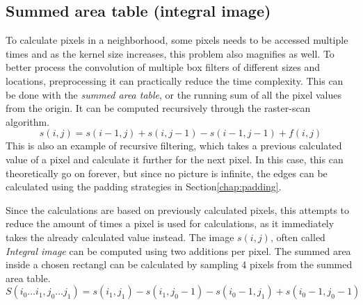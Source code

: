 \documentclass[twoside,a4paper,article]{combine}
\begin{document}
\subsection{Summed area table (integral image)}
To calculate pixels in a neighborhood, some pixels needs to be accessed multiple times and as the kernel size increases, this problem also magnifies as well. To
better process the convolution of multiple box filters of different sizes and locations, preprocessing it can practically reduce the time complexity. 
This can be done with the
\emph{summed area table}, or the running sum of all the pixel values from the origin. It can be computed recursively through the raster-scan algorithm.
\[
    s(i, j) = s(i - 1, j) + s(i, j - 1) - s(i - 1,j - 1) + f(i, j)   
\]
This is also an example of recursive filtering, which takes a previous calculated value of a pixel and calculate it further for the next pixel. In this case, this can theoretically go on forever, but since no picture is infinite,
the edges can be calculated using the padding strategies in Section\ref{chap:padding}.

Since the calculations are based on previously calculated pixels, this attempts to reduce the amount of times a pixel is used for calculations, as it immediately takes the already calculated value
instead. The image $s(i, j)$, often called \emph{Integral image} can be computed using two additions per pixel. The summed area inside a chosen rectangl can be calculated by sampling 4 pixels from the summed area table.
\[
    S(i_0\hdots i_1, j_0\hdots j_1) = s(i_1, j_1) - s(i_1, j_0 - 1) - s(i_0 - 1, j_1) + s(i_0 - 1, j_0 - 1)
\]
 
\end{document}
